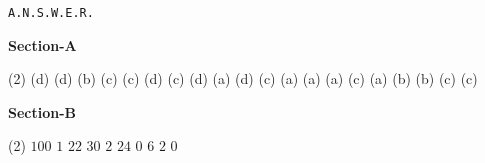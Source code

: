 \documentclass{article}
\begin{document}
\pagebreak

\begin{center}
\texttt{A.N.S.W.E.R.}
\end{center}

\begin{center}
\textbf{Section-A}
\end{center}
\begin{tasks}[label=\arabic*.](2)
	\task (d)
	\task (d)
	\task (b)
	\task (c)
	\task (c)
	\task (d)
	\task (c)
	\task (d)
	\task (a)
	\task (d)
	\task (c)
	\task (a)
	\task (a)
	\task (a)
	\task (c)
	\task (a)
	\task (b)
	\task (b)
	\task (c)
	\task (c)
\end{tasks}

\begin{center}
\textbf{Section-B}
\end{center}
\begin{tasks}[label=\arabic*.](2)
	\task $100$
	\task $1$
	\task $22$
	\task $30$
	\task $2$
	\task $24$
	\task $0$
	\task $6$
	\task $2$
	\task $0$
\end{tasks}
\end{document}
